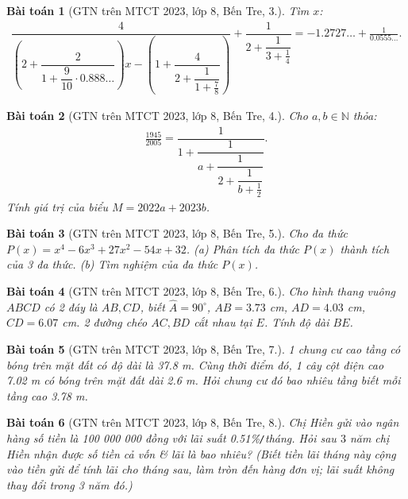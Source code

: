 \documentclass{article}
\newtheorem{baitoan}{Bài toán}
\begin{document}
\begin{baitoan}[GTN trên MTCT 2023, lớp 8, Bến Tre, 3.]
	Tìm $x$:
	\begin{align*}
		\dfrac{4}{\left(2 + \dfrac{2}{1 + \dfrac{9}{10}\cdot0.888\ldots}\right)x - \left(1 + \dfrac{4}{2 + \dfrac{1}{1 + \frac{7}{8}}}\right)} + \dfrac{1}{2 + \dfrac{1}{3 + \frac{1}{4}}} = -1.2727\ldots + \frac{1}{0.0555\ldots}.
	\end{align*}
\end{baitoan}

\begin{baitoan}[GTN trên MTCT 2023, lớp 8, Bến Tre, 4.]
	Cho $a,b\in\mathbb{N}$ thỏa:
	\begin{align*}
		\frac{1945}{2005} = \dfrac{1}{1 + \dfrac{1}{a + \dfrac{1}{2 + \dfrac{1}{b + \frac{1}{2}}}}}.
	\end{align*}
	Tính giá trị của biểu $M = 2022a + 2023b$.
\end{baitoan}

\begin{baitoan}[GTN trên MTCT 2023, lớp 8, Bến Tre, 5.]
	Cho đa thức $P(x) = x^4 - 6x^3 + 27x^2 - 54x + 32$. (a) Phân tích đa thức $P(x)$ thành tích của 3 đa thức. (b) Tìm nghiệm của đa thức $P(x)$.
\end{baitoan}

\begin{baitoan}[GTN trên MTCT 2023, lớp 8, Bến Tre, 6.]
	Cho hình thang vuông $ABCD$ có 2 đáy là $AB,CD$, biết $\widehat{A} = 90^\circ$, $AB = 3.73$ \emph{cm}, $AD = 4.03$ \emph{cm}, $CD = 6.07$ \emph{cm}. 2 đường chéo $AC,BD$ cắt nhau tại $E$. Tính độ dài $BE$.
\end{baitoan}

\begin{baitoan}[GTN trên MTCT 2023, lớp 8, Bến Tre, 7.]
	1 chung cư cao tầng có bóng trên mặt đất có độ dài là \emph{37.8 m}. Cùng thời điểm đó, 1 cây cột điện cao \emph{7.02 m} có bóng trên mặt đất dài \emph{2.6 m}. Hỏi chung cư đó bao nhiêu tầng biết mỗi tầng cao \emph{3.78 m}.
\end{baitoan}

\begin{baitoan}[GTN trên MTCT 2023, lớp 8, Bến Tre, 8.]
	Chị Hiền gửi vào ngân hàng số tiền là \emph{100 000 000 đồng} với lãi suất \emph{0.51\%\texttt{/}tháng}. Hỏi sau $3$ năm chị Hiền nhận được số tiền cả vốn \& lãi là bao nhiêu? (Biết tiền lãi tháng này cộng vào tiền gửi để tính lãi cho tháng sau, làm tròn đến hàng đơn vị; lãi suất không thay đổi trong 3 năm đó.)
\end{baitoan}
\end{document}
